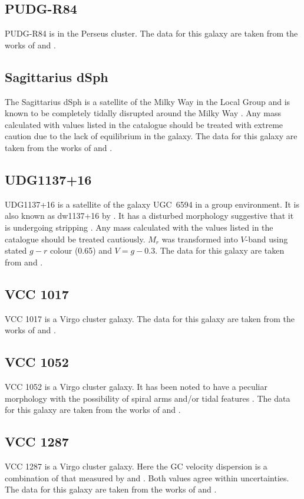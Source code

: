 \subsection{PUDG-R84}
PUDG-R84 is in the Perseus cluster. The data for this galaxy are taken from the works of \citet{Gannon2022} and \citet{FerreMateu2023}. 

\subsection{Sagittarius dSph}
The Sagittarius dSph is a satellite of the Milky Way in the Local Group and is known to be completely tidally disrupted around the Milky Way \citep{Ibata2001}. Any mass calculated with values listed in the catalogue should be treated with extreme caution due to the lack of equilibrium in the galaxy. The data for this galaxy are taken from the works of \citet{mcconnachie2012, Karachentsev2017} and \citet{Forbes2018}.

\subsection{UDG1137+16}
UDG1137+16 is a satellite of the galaxy UGC~6594 in a group environment. It is also known as dw1137+16 by \citet{Muller2018}. It has a disturbed morphology suggestive that it is undergoing stripping \citep{Gannon2021}. Any mass calculated with the values listed in the catalogue should be treated cautiously. $M_r$ was transformed into $V$-band using stated $g-r$ colour (0.65) and $V=g-0.3$. The data for this galaxy are taken from \citet{Gannon2021} and \citet{FerreMateu2023}.

\subsection{VCC 1017}
VCC 1017 is a Virgo cluster galaxy. The data for this galaxy are taken from the works of \citet{Lim2020} and \citet{Toloba2023}.

\subsection{VCC 1052}
VCC 1052 is a Virgo cluster galaxy. It has been noted to have a peculiar morphology with the possibility of spiral arms and/or tidal features \citep{Lim2020}. The data for this galaxy are taken from the works of \citet{Lim2020} and \citet{Toloba2023}.

\subsection{VCC 1287}
VCC 1287 is a Virgo cluster galaxy. Here the GC velocity dispersion is a combination of that measured by \citet[33$^{+16}_{-10}$]{Beasley2016} and \citet[39$^{+20}_{-12}$]{Toloba2023}. Both values agree within uncertainties. The data for this galaxy are taken from the works of \citet{Beasley2016, Gannon2020, Gannon2021, Lim2020} and \citet{Toloba2023}.

